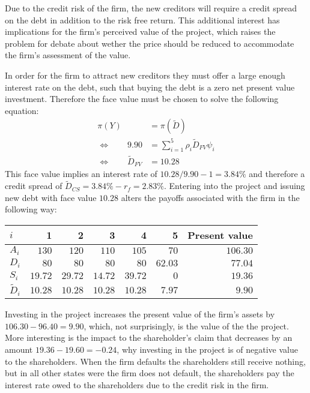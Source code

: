\documentclass[../main.tex]{subfiles}
\begin{document}
        Due to the credit risk of the firm, the new creditors will require a credit spread on the debt in addition to the risk free return. This additional interest has implications for the firm's perceived value of the project, which raises the problem for debate about wether the price should be reduced to accommodate the firm's assessment of the value.

        In order for the firm to attract new creditors they must offer a large enough interest rate on the debt, such that buying the debt is a zero net present value investment. Therefore the face value must be chosen to solve the following equation:
            \begin{align}
                \pi(Y) &= \pi(\tilde{D}) \\
                \Leftrightarrow  \qquad
                9.90 &= \sum_{i=1}^{5} \rho_{i}\tilde{D}_{FV}\psi_{i} \\
                \Leftrightarrow  \qquad
                \tilde{D}_{FV} &= 10.28
            \end{align}
        This face value implies an interest rate of $10.28 / 9.90 - 1 = 3.84\%$ and therefore a credit spread of $\tilde{D}_{CS} = 3.84\% - r_{f} = 2.83\%$. Entering into the project and issuing new debt with face value $10.28$ alters the payoffs associated with the firm in the following way:
        \begin{table}[H]
            \centering
            \begin{tabular}{l|rrrrr||r}
                $i$ & 1 & 2 & 3 & 4 & 5 & Present value \\
                \hline
                $A_{i}$ & $130$ & $120$ & $110$ & $105$ & $70$ & $106.30$ \\
                $D_{i}$ & $80$ & $80$ & $80$ & $80$ & $62.03$ & $77.04$ \\
                $S_{i}$ & $19.72$ & $29.72$ & $14.72$ & $39.72$ & $0$ & $19.36$ \\
                $\tilde{D}_{i}$ & $10.28$ & $10.28$ & $10.28$ & $10.28$ & $7.97$ & $9.90$ \\
            \end{tabular}
        \end{table}

        Investing in the project increases the present value of the firm's assets by $106.30 - 96.40 = 9.90$, which, not surprisingly, is the value of the the project. More interesting is the impact to the shareholder's claim that decreases by an amount $19.36 - 19.60 = -0.24$, why investing in the project is of negative value to the shareholders. When the firm defaults the shareholders still receive nothing, but in all other states were the firm does not default, the shareholders pay the interest rate owed to the shareholders due to the credit risk in the firm.
\end{document}
